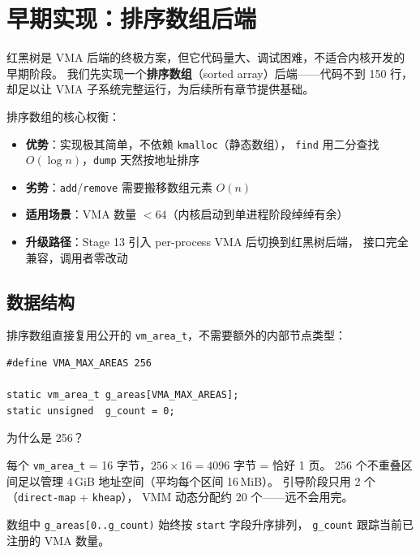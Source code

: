 \section{早期实现：排序数组后端}
\label{sec:vma-sorted-array}

红黑树是 VMA 后端的终极方案，但它代码量大、调试困难，不适合内核开发的早期阶段。
我们先实现一个\textbf{排序数组}（sorted array）后端——代码不到 150 行，
却足以让 VMA 子系统完整运行，为后续所有章节提供基础。

\begin{designbox}
排序数组的核心权衡：

\begin{itemize}
  \item \textbf{优势}：实现极其简单，不依赖 \texttt{kmalloc}（静态数组），
        \texttt{find} 用二分查找 $O(\log n)$，\texttt{dump} 天然按地址排序
  \item \textbf{劣势}：\texttt{add}/\texttt{remove} 需要搬移数组元素 $O(n)$
  \item \textbf{适用场景}：VMA 数量 $< 64$（内核启动到单进程阶段绰绰有余）
  \item \textbf{升级路径}：Stage 13 引入 per-process VMA 后切换到红黑树后端，
        接口完全兼容，调用者零改动
\end{itemize}
\end{designbox}

\subsection{数据结构}

排序数组直接复用公开的 \texttt{vm\_area\_t}，不需要额外的内部节点类型：

\begin{lstlisting}[style=cstyle]
#define VMA_MAX_AREAS 256

static vm_area_t g_areas[VMA_MAX_AREAS];
static unsigned  g_count = 0;
\end{lstlisting}

\begin{whybox}
为什么是 256？

每个 \texttt{vm\_area\_t} = 16 字节，$256 \times 16 = 4096$ 字节 = 恰好 1 页。
256 个不重叠区间足以管理 4\,GiB 地址空间（平均每个区间 16\,MiB）。
引导阶段只用 2 个（\texttt{direct-map} + \texttt{kheap}），
VMM 动态分配约 20 个——远不会用完。
\end{whybox}

数组中 \texttt{g\_areas[0..g\_count)} 始终按 \texttt{start} 字段升序排列，
\texttt{g\_count} 跟踪当前已注册的 VMA 数量。

